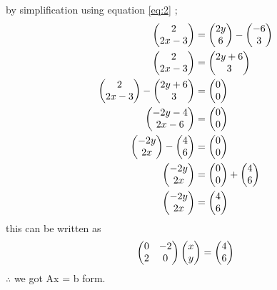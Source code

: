 \documentclass[journal,12pt,twocolumn]{IEEEtran}
\begin{document}
      by simplification using equation \eqref{eq:2} ;
      \begin{align}
      \myvec{2\\2x-3 } &= \myvec{2y\\6} - \myvec{-6\\3} 
      \\ 
      \myvec{2\\2x-3 } &= \myvec{2y+6\\3}
      \\ 
      \myvec{2\\2x-3 } - \myvec{2y+6\\3} &= \myvec{0\\0}
      \\
      \myvec{-2y-4\\2x-6 } &= \myvec{0\\0}
      \\
      \myvec{-2y\\2x} -\myvec{4\\6} &= \myvec{0\\0}
      \\
      \myvec{-2y\\2x } &= \myvec{0\\0} + \myvec{4\\6}
      \\
      \myvec{-2y\\2x } &= \myvec{4\\6}
      \end{align}
      this can be written as 
     \begin{align}
     \myvec{0 & -2\\2 & 0} \myvec{x\\y}= \myvec{4\\6}
     \end{align}
     $\therefore$ we got Ax = b form.  
\end{document}
